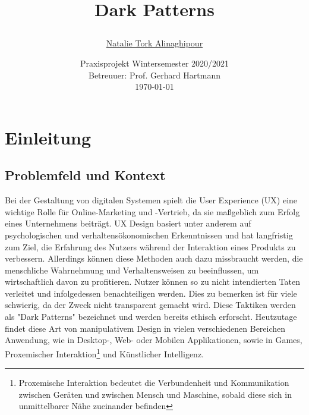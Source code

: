 \documentclass[a4paper]{article}
\begin{document}
	\title{
	\begin{figure}[!ht]
	\end{figure}
	\vspace{1cm}
	\Huge Dark Patterns
	}
	
	\vspace{1cm}

	

	\author{\Large \href{mailto:natalie.tork_alinaghipour@smail.th-koeln.de}{Natalie Tork Alinaghipour} 
	\vspace{1cm}}
	
	\date{
	\large Praxisprojekt Wintersemester 2020/2021 \\ 
	\vspace{0.8cm}
	\large Betreuuer: Prof. Gerhard Hartmann \\
	\vspace{1cm}
	\today
	}

	\maketitle
	\setlength{\parindent}{0pt}

\vspace{2cm}
\begin{abstract}


\end{abstract}
	\newpage
	\tableofcontents
	\newpage
	
\section{Einleitung} 
\label{sec:einleitung}

\subsection{Problemfeld und Kontext}
\label{sub:problemfeld_und_kontext}
Bei der Gestaltung von digitalen Systemen spielt die User Experience (UX) eine wichtige Rolle für Online-Marketing und -Vertrieb, da sie maßgeblich zum Erfolg eines Unternehmens beiträgt. UX Design basiert unter anderem auf psychologischen und verhaltensökonomischen Erkenntnissen und hat langfristig zum Ziel, die Erfahrung des Nutzers während der Interaktion eines Produkts zu verbessern. Allerdings können diese Methoden auch dazu missbraucht werden, die menschliche Wahrnehmung und Verhaltensweisen zu beeinflussen, um wirtschaftlich davon zu profitieren. Nutzer können so zu nicht intendierten Taten verleitet und infolgedessen benachteiligen werden. Dies zu bemerken ist für viele schwierig, da der Zweck nicht transparent gemacht wird.
Diese Taktiken werden als "Dark Patterns" bezeichnet und werden bereits ethisch erforscht. Heutzutage findet diese Art von manipulativem Design in vielen verschiedenen Bereichen Anwendung, wie in Desktop-, Web- oder Mobilen Applikationen, sowie in Games, Proxemischer Interaktion\footnote{\label{foot:1} Proxemische Interaktion bedeutet die Verbundenheit und Kommunikation zwischen Geräten und zwischen Mensch und Maschine, sobald diese sich in unmittelbarer Nähe zueinander befinden} und Künstlicher Intelligenz. 
\end{document}
